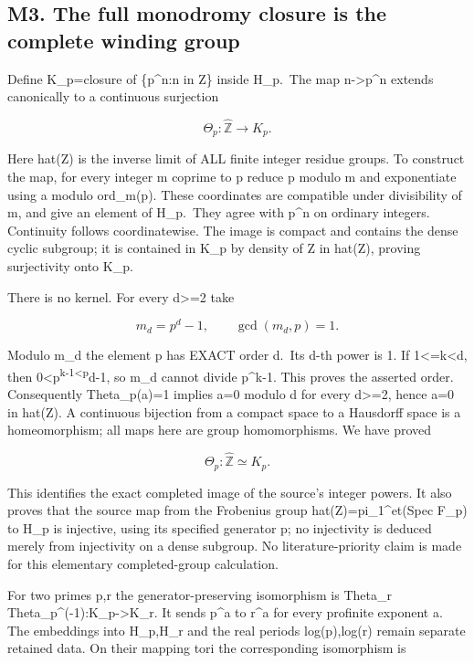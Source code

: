 \documentclass[
]{article}
\begin{document}
\subsection{M3. The full monodromy closure is the complete winding
group}\label{m3.-the-full-monodromy-closure-is-the-complete-winding-group}

Define K\_p=closure of \{p\^{}n:n in Z\} inside H\_p.~The map
n-\textgreater p\^{}n extends canonically to a continuous surjection

\[
\Theta_p:\widehat{\mathbb Z}\longrightarrow K_p.
\tag{M3.1}
\]

Here hat(Z) is the inverse limit of ALL finite integer residue groups.
To construct the map, for every integer m coprime to p reduce p modulo m
and exponentiate using a modulo ord\_m(p). These coordinates are
compatible under divisibility of m, and give an element of H\_p.~They
agree with p\^{}n on ordinary integers. Continuity follows
coordinatewise. The image is compact and contains the dense cyclic
subgroup; it is contained in K\_p by density of Z in hat(Z), proving
surjectivity onto K\_p.

There is no kernel. For every d\textgreater=2 take

\[
m_d=p^d-1,\qquad \gcd(m_d,p)=1.
\tag{M3.2}
\]

Modulo m\_d the element p has EXACT order d.~Its d-th power is 1. If
1\textless=k\textless d, then
0\textless p\textsuperscript{k-1\textless p}d-1, so m\_d cannot divide
p\^{}k-1. This proves the asserted order. Consequently Theta\_p(a)=1
implies a=0 modulo d for every d\textgreater=2, hence a=0 in hat(Z). A
continuous bijection from a compact space to a Hausdorff space is a
homeomorphism; all maps here are group homomorphisms. We have proved

\[
\boxed{\Theta_p:\widehat{\mathbb Z}\simeq K_p.}
\tag{M3.3}
\]

This identifies the exact completed image of the source's integer
powers. It also proves that the source map from the Frobenius group
hat(Z)=pi\_1\^{}et(Spec F\_p) to H\_p is injective, using its specified
generator p; no injectivity is deduced merely from injectivity on a
dense subgroup. No literature-priority claim is made for this elementary
completed-group calculation.

For two primes p,r the generator-preserving isomorphism is Theta\_r
Theta\_p\^{}(-1):K\_p-\textgreater K\_r. It sends p\^{}a to r\^{}a for
every profinite exponent a. The embeddings into H\_p,H\_r and the real
periods log(p),log(r) remain separate retained data. On their mapping
tori the corresponding isomorphism is
\end{document}
